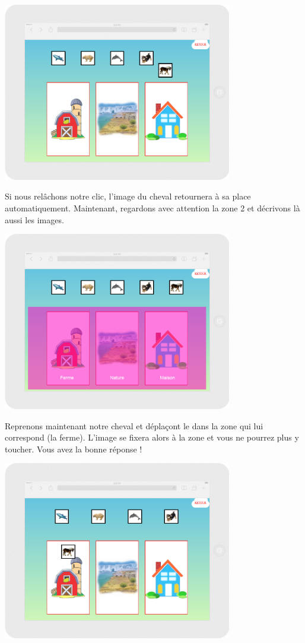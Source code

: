 \documentclass{article}
\begin{document}
\begin{center}
\includegraphics[width=0.75\textwidth]{zone2}
\end{center}
\vspace{0.5cm}
Si nous rel\^achons notre clic, l'image du cheval retournera à sa place automatiquement. Maintenant, regardons avec attention la zone 2 et décrivons là aussi les images. 
\vspace{0.5cm}\\
\begin{center}
\includegraphics[width=0.75\textwidth]{zone3}
\end{center}
\vspace{0.5cm}
Reprenons maintenant notre cheval et dépla\c{c}ont le dans la zone qui lui correspond (la ferme). L'image se fixera alors à la zone et vous ne pourrez plus y toucher. Vous avez la bonne réponse !
\vspace{0.5cm}\\
\begin{center}
\includegraphics[width=0.75\textwidth]{zone4}
\end{center}
\end{document}
